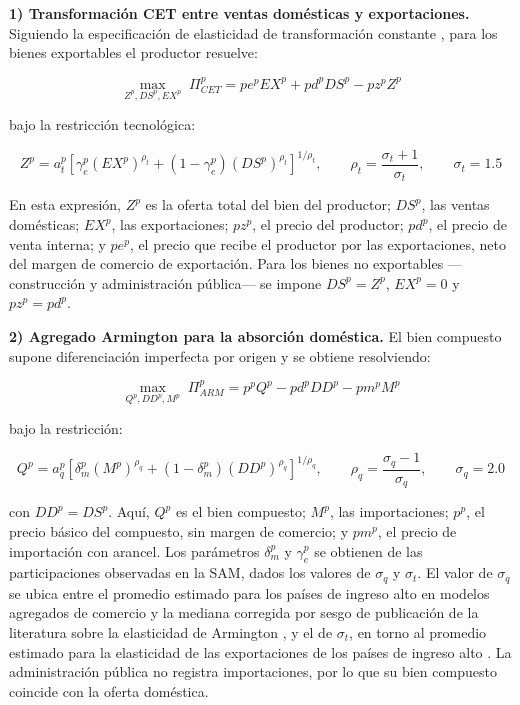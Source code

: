 \documentclass[11pt]{article}
\begin{document}
\textbf{1) Transformación CET entre ventas domésticas y exportaciones.} Siguiendo la especificación de elasticidad de transformación constante \cite{powell_gruen_1968}, para los bienes exportables el productor resuelve:

\[
\max_{Z^{p},DS^{p},EX^{p}} \; \Pi_{CET}^{p}=pe^{p}EX^{p}+pd^{p}DS^{p}-pz^{p}Z^{p}
\]

bajo la restricción tecnológica:

\[
Z^{p}=a_{t}^{p}\left[\gamma_{e}^{p}\left(EX^{p}\right)^{\rho_{t}}+\left(1-\gamma_{e}^{p}\right)\left(DS^{p}\right)^{\rho_{t}}\right]^{1/\rho_{t}},
\qquad \rho_{t}=\frac{\sigma_{t}+1}{\sigma_{t}},\qquad \sigma_{t}=1.5
\]

En esta expresión, $Z^{p}$ es la oferta total del bien del productor; $DS^{p}$, las ventas domésticas; $EX^{p}$, las exportaciones; $pz^{p}$, el precio del productor; $pd^{p}$, el precio de venta interna; y $pe^{p}$, el precio que recibe el productor por las exportaciones, neto del margen de comercio de exportación. Para los bienes no exportables ---construcción y administración pública--- se impone $DS^{p}=Z^{p}$, $EX^{p}=0$ y $pz^{p}=pd^{p}$.

\textbf{2) Agregado Armington para la absorción doméstica.} El bien compuesto supone diferenciación imperfecta por origen \cite{armington_1969} y se obtiene resolviendo:

\[
\max_{Q^{p},DD^{p},M^{p}} \; \Pi_{ARM}^{p}=p^{p}Q^{p}-pd^{p}DD^{p}-pm^{p}M^{p}
\]

bajo la restricción:

\[
Q^{p}=a_{q}^{p}\left[\delta_{m}^{p}\left(M^{p}\right)^{\rho_{q}}+\left(1-\delta_{m}^{p}\right)\left(DD^{p}\right)^{\rho_{q}}\right]^{1/\rho_{q}},
\qquad \rho_{q}=\frac{\sigma_{q}-1}{\sigma_{q}},\qquad \sigma_{q}=2.0
\]

con $DD^{p}=DS^{p}$. Aquí, $Q^{p}$ es el bien compuesto; $M^{p}$, las importaciones; $p^{p}$, el precio básico del compuesto, sin margen de comercio; y $pm^{p}$, el precio de importación con arancel. Los parámetros $\delta_{m}^{p}$ y $\gamma_{e}^{p}$ se obtienen de las participaciones observadas en la SAM, dados los valores de $\sigma_{q}$ y $\sigma_{t}$. El valor de $\sigma_{q}$ se ubica entre el promedio estimado para los países de ingreso alto en modelos agregados de comercio \cite{devarajan_go_robinson_2023} y la mediana corregida por sesgo de publicación de la literatura sobre la elasticidad de Armington \cite{bajzik_etal_2020}, y el de $\sigma_{t}$, en torno al promedio estimado para la elasticidad de las exportaciones de los países de ingreso alto \cite{devarajan_go_robinson_2023}. La administración pública no registra importaciones, por lo que su bien compuesto coincide con la oferta doméstica.
\end{document}
